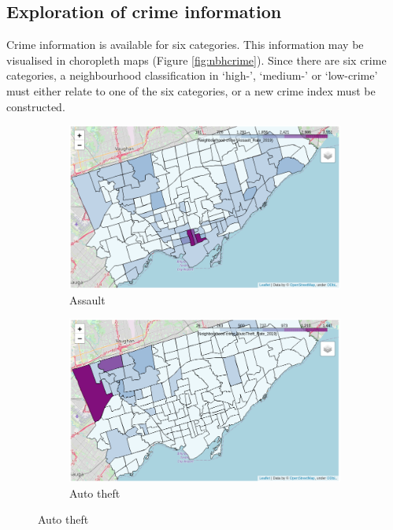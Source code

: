\documentclass{article}
\begin{document}
\subsection{Exploration of crime information}
Crime information is available for six categories. This information may be visualised in choropleth maps (Figure \ref{fig:nbhcrime}). Since there are six crime categories, a neighbourhood classification in `high-', `medium-' or `low-crime' must either relate to one of the six categories, or a new crime index must be constructed. 
\begin{figure}[ht]
     \centering
     \begin{subfigure}[b]{0.47\textwidth}
         \centering
         \includegraphics[width=\textwidth]{pics/assault2}
         \caption{Assault}
     \end{subfigure}
     \hfill
     \begin{subfigure}[b]{0.47\textwidth}
         \centering
         \includegraphics[width=\textwidth]{pics/auto}
         \caption{Auto theft}
     \end{subfigure}

\end{figure}
\end{document}
